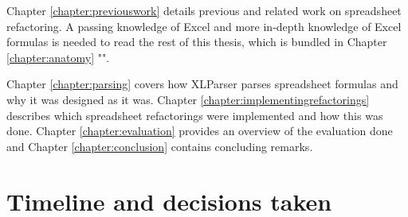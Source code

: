Chapter \ref{chapter:previouswork} details previous and related work on spreadsheet refactoring.
A passing knowledge of Excel and more in-depth knowledge of Excel formulas is needed to read the rest of this thesis, which is bundled in Chapter \ref{chapter:anatomy} "".

Chapter \ref{chapter:parsing} covers how XLParser parses spreadsheet formulas and why it was designed as it was.
Chapter \ref{chapter:implementingrefactorings} describes which spreadsheet refactorings were implemented and how this was done.
Chapter \ref{chapter:evaluation} provides an overview of the evaluation done and Chapter \ref{chapter:conclusion} contains concluding remarks.

\clearpage
\section{Timeline and decisions taken}

